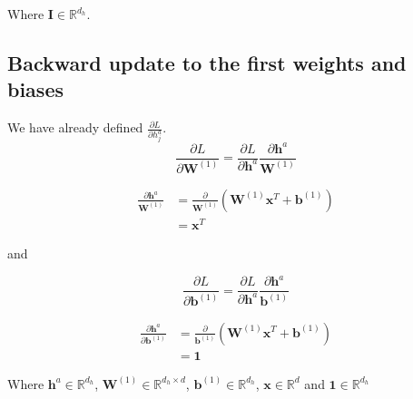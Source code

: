 \documentclass[reqno]{amsart}
\theoremstyle{definition}
\theoremstyle{remark}
\numberwithin{equation}{section}
\begin{document}
Where $\mathbf{I} \in \mathbb{R}^{d_h}$.\\

\subsection{Backward update to the first weights and biases}

We have already defined $\frac{\partial L}{\partial h^a_j}$. \\

\begin{equation}
    \frac{\partial L}{\partial \mathbf{W}^{(1)}} = \frac{\partial L}{\partial \mathbf{h}^a}\frac{\partial \mathbf{h}^a}{ \mathbf{W}^{(1)}}
\end{equation}

\begin{align}
    \frac{\partial \mathbf{h}^a}{ \mathbf{W}^{(1)}} &= \frac{\partial}{\mathbf{W}^{(1)}} (\mathbf{W}^{(1)} \mathbf{x}^T+ \mathbf{b}^{(1)}) \\
    &= \mathbf{x}^T
\end{align}

and

\begin{equation}
    \frac{\partial L}{\partial \mathbf{b}^{(1)}} = \frac{\partial L}{\partial \mathbf{h}^a}\frac{\partial \mathbf{h}^a}{ \mathbf{b}^{(1)}}
\end{equation}

\begin{align}
    \frac{\partial \mathbf{h}^a}{ \partial \mathbf{b}^{(1)}} &= \frac{\partial}{\mathbf{b}^{(1)}} (\mathbf{W}^{(1)} \mathbf{x}^T+ \mathbf{b}^{(1)}) \\
    &= \mathbf{1}
\end{align}

Where $\mathbf{h}^{a} \in \mathbb{R}^{d_h}$, $\mathbf{W}^{(1)} \in \mathbb{R}^{d_h \times d}$, $\mathbf{b}^{(1)} \in \mathbb{R}^{d_h}$, $\mathbf{x} \in \mathbb{R}^{d}$ and $\mathbf{1} \in \mathbb{R}^{d_h}$\\

%
%
%
\end{document}
